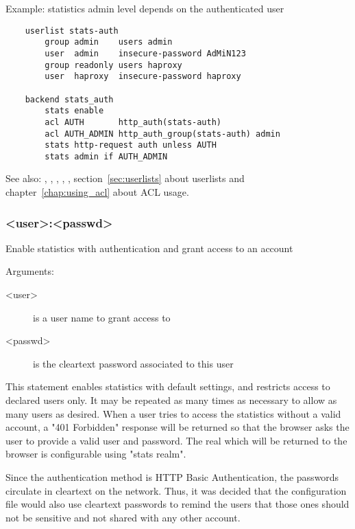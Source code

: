 {  Example: statistics admin level depends on the authenticated user
  \begin{verbatim}
    userlist stats-auth
        group admin    users admin
        user  admin    insecure-password AdMiN123
        group readonly users haproxy
        user  haproxy  insecure-password haproxy

    backend stats_auth
        stats enable
        acl AUTH       http_auth(stats-auth)
        acl AUTH_ADMIN http_auth_group(stats-auth) admin
        stats http-request auth unless AUTH
        stats admin if AUTH_ADMIN
  \end{verbatim}

  See also: , , , ,
            , section~\ref{sec:userlists} about userlists and chapter~\ref{chap:using_acl} about
             ACL usage.

\subsubsection[stats auth]{ <user>:<passwd>}

  Enable statistics with authentication and grant access to an account


  Arguments:
  \begin{description}
  \item[<user>] is a user name to grant access to
  \item[<passwd>] is the cleartext password associated to this user
  \end{description}

  This statement enables statistics with default settings, and restricts access
  to declared users only. It may be repeated as many times as necessary to
  allow as many users as desired. When a user tries to access the statistics
  without a valid account, a "401 Forbidden" response will be returned so that
  the browser asks the user to provide a valid user and password. The real
  which will be returned to the browser is configurable using "stats realm".

  Since the authentication method is HTTP Basic Authentication, the passwords
  circulate in cleartext on the network. Thus, it was decided that the
  configuration file would also use cleartext passwords to remind the users
  that those ones should not be sensitive and not shared with any other account.

}
